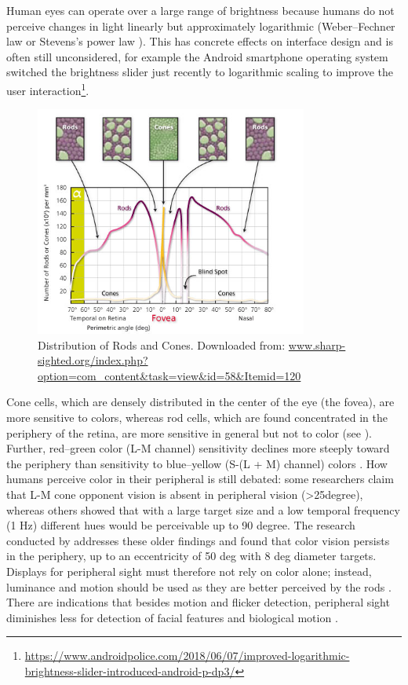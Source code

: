 Human eyes can operate over a large range of brightness because humans do not perceive changes in light linearly but approximately logarithmic (Weber–Fechner law or Stevens's power law \citep[see][]{Brill2014DoesQuestion}). This has concrete effects on interface design and is often still unconsidered, for example the Android smartphone operating system switched the brightness slider just recently to logarithmic scaling to improve the user interaction\footnote{\url{https://www.androidpolice.com/2018/06/07/improved-logarithmic-brightness-slider-introduced-android-p-dp3/}}. 
\begin{figure}
    \includegraphics[width=0.8\textwidth]{fig/jjsDG.jpg}
    \caption[Distribution of Rods and Cones]{Distribution of Rods and Cones. Downloaded from: \url{www.sharp-sighted.org/index.php?option=com_content&task=view&id=58&Itemid=120}}
    \label{fig:eye}
\end{figure}
Cone cells, which are densely distributed in the center of the eye (the fovea), are more sensitive to colors, whereas rod cells, which are found concentrated in the periphery of the retina, are more sensitive in general but not to color (see \emph{}). Further, red–green color (L-M channel) sensitivity declines more steeply toward the periphery than sensitivity to blue–yellow  (S-(L + M) channel) colors \citep{Hansen2009ColorField}. How humans perceive color in their peripheral is still debated: some researchers claim that L-M cone opponent vision is absent in peripheral vision (>25degree), whereas others showed that with a large target size and a low temporal frequency (1 Hz) different hues would be perceivable up to 90 degree. The research conducted by \cite{Hansen2009ColorField} addresses these older findings and found that color vision persists in the periphery, up to an eccentricity of 50 deg with 8 deg diameter targets. Displays for peripheral sight must therefore not rely on color alone; instead, luminance and motion should be used as they are better perceived by the rods \citep{Monaco2007MotionField}. There are indications that besides motion and flicker detection, peripheral sight diminishes less for detection of facial features and biological motion \cite{Thompson2007PeripheralSegregation}.

